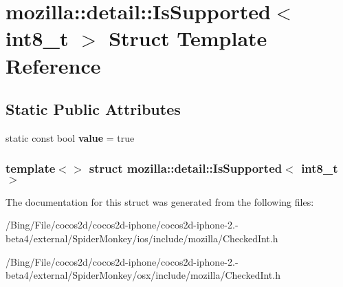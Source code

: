 \hypertarget{structmozilla_1_1detail_1_1_is_supported_3_01int8__t_01_4}{\section{mozilla\-:\-:detail\-:\-:Is\-Supported$<$ int8\-\_\-t $>$ Struct Template Reference}
\label{structmozilla_1_1detail_1_1_is_supported_3_01int8__t_01_4}
}
\subsection*{Static Public Attributes}
\begin{DoxyCompactItemize}
\item 
\hypertarget{structmozilla_1_1detail_1_1_is_supported_3_01int8__t_01_4_a274624289e664184057db0c8a010481f}{static const bool {\bfseries value} = true}\label{structmozilla_1_1detail_1_1_is_supported_3_01int8__t_01_4_a274624289e664184057db0c8a010481f}

\end{DoxyCompactItemize}
\subsubsection*{template$<$$>$ struct mozilla\-::detail\-::\-Is\-Supported$<$ int8\-\_\-t $>$}



The documentation for this struct was generated from the following files\-:\begin{DoxyCompactItemize}
\item 
/\-Bing/\-File/cocos2d/cocos2d-\/iphone/cocos2d-\/iphone-\/2.-\/beta4/external/\-Spider\-Monkey/ios/include/mozilla/Checked\-Int.\-h\item 
/\-Bing/\-File/cocos2d/cocos2d-\/iphone/cocos2d-\/iphone-\/2.-\/beta4/external/\-Spider\-Monkey/osx/include/mozilla/Checked\-Int.\-h\end{DoxyCompactItemize}
